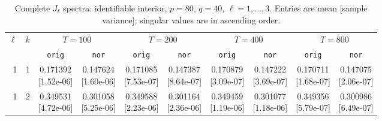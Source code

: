 \documentclass[12pt,letterpaper]{article}
\def\spacingset#1{\renewcommand{\baselinestretch}{#1}\small\normalsize}
\theoremstyle{plain}
\theoremstyle{definition}
\begin{document}
\begin{table}[p]
\begingroup
\spacingset{1.0}
\small\centering
\caption{Complete $J_\ell$ spectra: identifiable interior, $p=80$, $q=40$, $\ell=1,\ldots,3$. Entries are mean [sample variance]; singular values are in ascending order.}
\label{s23:lambda:alltab:spectra:p80q40interior:1-3}
\footnotesize
\setlength{\tabcolsep}{2.2pt}
\renewcommand{\arraystretch}{1.03}
\begin{adjustbox}{max width=\linewidth}
\begin{tabular}{@{}rr*{8}{c}@{}}
\toprule
$\ell$ & $k$ & \multicolumn{2}{c}{$T=100$} & \multicolumn{2}{c}{$T=200$} & \multicolumn{2}{c}{$T=400$} & \multicolumn{2}{c}{$T=800$}\\
\cmidrule(lr){3-4}\cmidrule(lr){5-6}\cmidrule(lr){7-8}\cmidrule(lr){9-10}
 &  & \texttt{orig} & \texttt{nor} & \texttt{orig} & \texttt{nor} & \texttt{orig} & \texttt{nor} & \texttt{orig} & \texttt{nor}\\
\midrule
1 & 1 & \shortstack{0.171392\\[-1pt]{\scriptsize[1.52e-06]}} & \shortstack{0.147624\\[-1pt]{\scriptsize[1.60e-06]}} & \shortstack{0.171085\\[-1pt]{\scriptsize[7.53e-07]}} & \shortstack{0.147387\\[-1pt]{\scriptsize[8.64e-07]}} & \shortstack{0.170879\\[-1pt]{\scriptsize[3.09e-07]}} & \shortstack{0.147222\\[-1pt]{\scriptsize[3.69e-07]}} & \shortstack{0.170711\\[-1pt]{\scriptsize[1.68e-07]}} & \shortstack{0.147075\\[-1pt]{\scriptsize[2.06e-07]}}\\
1 & 2 & \shortstack{0.349531\\[-1pt]{\scriptsize[4.72e-06]}} & \shortstack{0.301058\\[-1pt]{\scriptsize[5.25e-06]}} & \shortstack{0.349588\\[-1pt]{\scriptsize[2.23e-06]}} & \shortstack{0.301164\\[-1pt]{\scriptsize[2.36e-06]}} & \shortstack{0.349459\\[-1pt]{\scriptsize[1.19e-06]}} & \shortstack{0.301077\\[-1pt]{\scriptsize[1.18e-06]}} & \shortstack{0.349356\\[-1pt]{\scriptsize[5.79e-07]}} & \shortstack{0.300986\\[-1pt]{\scriptsize[6.49e-07]}}\\

\end{tabular}
\end{adjustbox}
\end{table}
\end{document}

